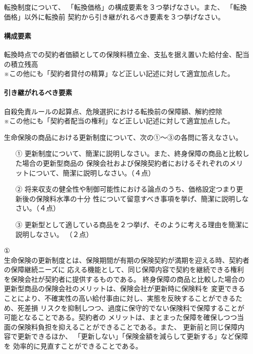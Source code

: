 \documentclass[report,gutter=10mm,fore-edge=10mm,uplatex,dvipdfmx]{jlreq}
\begin{document}
転換制度について、
「転換価格」の構成要素を３つ挙げなさい。また、
「転換価格」以外に転換前
契約から引き継がれるべき要素を３つ挙げなさい。

\paragraph{構成要素}
転換時点での契約者価額としての保険料積立金、支払を据え置いた給付金、配当の積立残高\\
※この他にも「契約者貸付の精算」など正しい記述に対して適宜加点した。
\paragraph{引き継がれるべき要素}
自殺免責ルールの起算点、危険選択における転換前の保障額、解約控除\\
※この他にも「契約者配当の権利」など正しい記述に対して適宜加点した。


生命保険の商品における更新制度について、次の①～③の各問に答えなさい。
\begin{enumerate}
 \item [①] 更新制度について、簡潔に説明しなさい。また、終身保障の商品と比較した場合の更新型商品の
 保険会社および保険契約者におけるそれぞれのメリットについて、簡潔に説明しなさい。（４点）
 \item [②] 将来収支の健全性や制御可能性における論点のうち、価格設定つまり更新後の保険料水準の十分
 性について留意すべき事項を挙げ、簡潔に説明しなさい。（４点）
 \item [③] 更新型として適している商品を２つ挙げ、そのように考える理由を簡潔に説明しなさい。 （２点）
\end{enumerate}

①\\
生命保険の更新制度とは、保険期間が有期の保険契約が満期を迎える時、契約者の保障継続ニーズに
応える機能として、同じ保障内容で契約を継続できる権利を保険会社が契約者に提供するものである。
終身保障の商品と比較した場合の更新型商品の保険会社のメリットは、保険会社が更新時に保険料を
変更できることにより、不確実性の高い給付事由に対し、実態を反映することができるため、死差損
リスクを抑制しつつ、過度に保守的でない保険料で保障することが可能となることである。契約者の
メリットは、まとまった保障を確保しつつ当面の保険料負担を抑えることができることである。また、
更新前と同じ保障内容で更新できるほか、
「更新しない」「保険金額を減らして更新する」など保障を
効率的に見直すことができることである。
\end{document}
